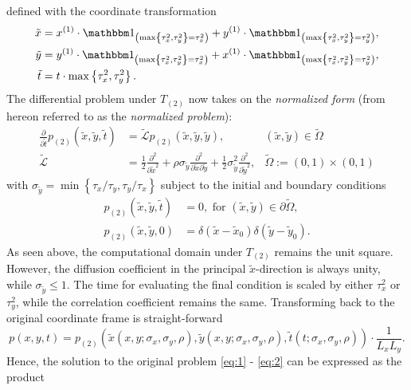 defined with the coordinate transformation
\begin{align}
  \tilde{x} &= x^{(1)}\cdot \Indicator{ \max\left\{\tau_x^2, \tau_y^2 \right\} = \tau_x^2} + y^{(1)}\cdot \Indicator{ \max\left\{\tau_x^2, \tau_y^2 \right\} = \tau_y^2}, \\
  \tilde{y} &= y^{(1)}\cdot \Indicator{ \max\left\{\tau_x^2, \tau_y^2 \right\} = \tau_x^2} + x^{(1)}\cdot \Indicator{ \max\left\{\tau_x^2, \tau_y^2 \right\} = \tau_y^2}, \\
  \tilde{t} &= t\cdot \max\left\{\tau_x^2, \tau_y^2 \right\}.
\end{align}
The differential problem under $T_{(2)}$ now takes on the
\textit{normalized form} (from hereon referred to as the
\textit{normalized problem}):
\begin{align}
  \frac{\partial}{\partial \tilde{t}} p_{(2)}(\tilde{x},\tilde{y},\tilde{t}) &= \tilde{\mathcal{L}} p_{(2)}(\tilde{x},\tilde{y},\tilde{y}), & (\tilde{x}, \tilde{y}) \in \tilde{\Omega} \label{eq:qqq} \\
  \tilde{\mathcal{L}} &= \frac{1}{2} \frac{\partial^2}{\partial \tilde{x}^2} + \rho \sigma_{\tilde{y}} \frac{\partial^2}{\partial \tilde{x} \partial \tilde{y}} + \frac{1}{2} \sigma^2_{\tilde{y}} \frac{\partial^2}{\partial \tilde{y}^2},& \tilde{\Omega} := (0,1) \times (0,1)
\end{align}
with
$\sigma_{\tilde{y}} = \min\left\{ \tau_x/\tau_y, \tau_y/\tau_x
\right\}$ subject to the initial and boundary conditions
\begin{align}
  p_{(2)}(\tilde{x},\tilde{y},\tilde{t}) &=0,  \mbox{ for }  (\tilde{x},\tilde{y}) \in \partial\tilde{\Omega}, \nonumber \\
  p_{(2)}(\tilde{x},\tilde{y},0) &= \delta\left( \tilde{x} - \tilde{x}_0 \right)\delta\left( \tilde{y} - \tilde{y}_0 \right). \label{eq:qqq-2}
\end{align}
As seen above, the computational domain under $T_{(2)}$ remains the
unit square. However, the diffusion coefficient in the principal
$\tilde{x}$-direction is always unity, while
$\sigma_{\tilde{y}} \leq 1$. The time for evaluating the final
condition is scaled by either $\tau_x^2$ or $\tau_y^2$, while the
correlation coefficient remains the same. Transforming back to the
original coordinate frame is straight-forward
\[
  p(x,y,t) = p_{(2)}(\tilde{x}(x,y; \sigma_x,\sigma_y,\rho), \tilde{y}(x,y; \sigma_x,\sigma_y,\rho), \tilde{t}(t; \sigma_x,\sigma_y,\rho)) \cdot \frac{1}{L_xL_y}.
\]
Hence, the solution to the original problem \eqref{eq:1} -
\eqref{eq:2} can be expressed as the product
